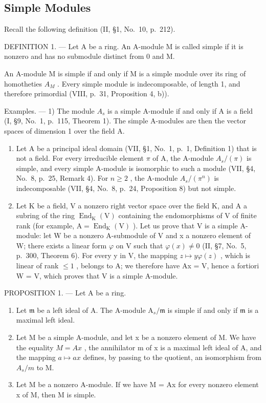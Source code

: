 \subsection{Simple Modules}

Recall the following definition (II, §1, No.~10, p.~212).

DEFINITION 1. --- Let A be a ring. An A-module M is called simple if it is nonzero and has no submodule distinct from 0 and M.

An A-module M is simple if and only if M is a simple module over its ring of homotheties \(A_{M}\) . Every simple module is indecomposable, of length 1, and therefore primordial (VIII, p.~31, Proposition 4, b)).

Examples. --- 1) The module \(A_{s}\) is a simple A-module if and only if A is a field (I, §9, No.~1, p.~115, Theorem 1). The simple A-modules are then the vector spaces of dimension 1 over the field A.

\begin{enumerate}
\def\labelenumi{\arabic{enumi})}
\setcounter{enumi}{1}
\item
  Let A be a principal ideal domain (VII, §1, No.~1, p.~1, Definition 1) that is not a field. For every irreducible element \(\pi\) of A, the A-module \(A_s / (\pi)\) is simple, and every simple A-module is isomorphic to such a module (VII, §4, No.~8, p.~25, Remark 4). For \(n \geqslant 2\) , the A-module \(A_s / (\pi^n)\) is indecomposable (VII, §4, No.~8, p.~24, Proposition 8) but not simple.
\item
  Let K be a field, V a nonzero right vector space over the field K, and A a subring of the ring \(\operatorname{End}_{\mathrm{K}}(\mathrm{V})\) containing the endomorphisms of V of finite rank (for example, \(\mathrm{A} = \operatorname{End}_{\mathrm{K}}(\mathrm{V})\) ). Let us prove that V is a simple A-module: let W be a nonzero A-submodule of V and x a nonzero element of W; there exists a linear form \(\varphi\) on V such that \(\varphi(x) \neq 0\) (II, §7, No.~5, p.~300, Theorem 6). For every y in V, the mapping \(z \mapsto y\varphi(z)\) , which is linear of rank \(\leqslant 1\) , belongs to A; we therefore have Ax = V, hence a fortiori W = V, which proves that V is a simple A-module.
\end{enumerate}

PROPOSITION 1. --- Let A be a ring.

\begin{enumerate}
\def\labelenumi{\alph{enumi})}
\item
  Let \(\mathfrak{m}\) be a left ideal of A. The A-module \(\mathrm{A}_s / \mathfrak{m}\) is simple if and only if \(\mathfrak{m}\) is a maximal left ideal.
\item
  Let M be a simple A-module, and let x be a nonzero element of M. We have the equality \(M = Ax\) , the annihilator m of x is a maximal left ideal of A, and the mapping \(a \mapsto ax\) defines, by passing to the quotient, an isomorphism from \(A_{s}/m\) to M.
\item
  Let M be a nonzero A-module. If we have M = Ax for every nonzero element x of M, then M is simple.
\end{enumerate}

